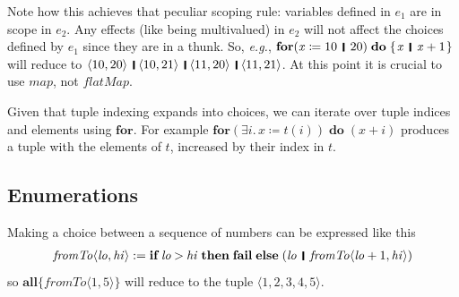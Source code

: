 \documentclass[acmsmall,review,dvipsnames]{acmart}
\newcommand{\Varid}[1]{\mathit{#1}}
\newcommand{\eg}{\emph{e.g.}}
\begin{document}
Note how this achieves that peculiar scoping rule: variables defined in \ensuremath{\Varid{e}_{\mathrm{1}}} are in scope in \ensuremath{\Varid{e}_{\mathrm{2}}}.
Any effects (like being multivalued) in \ensuremath{\Varid{e}_{\mathrm{2}}} will not affect the choices defined by \ensuremath{\Varid{e}_{\mathrm{1}}} since they are in a thunk.
So, {\eg}, \ensuremath{\textbf{for} (\Varid{x}\mathrel{\coloneqq}\mathrm{10}\hspace{1mm}\mathop{\rule[-0.3mm]{0.5mm}{2.5mm}}\hspace{1mm}\mathrm{20})\;\textbf{do}\;\{\mskip1.5mu \Varid{x}\hspace{1mm}\mathop{\rule[-0.3mm]{0.5mm}{2.5mm}}\hspace{1mm}\Varid{x}\mathbin{+}\mathrm{1}\mskip1.5mu\}} will reduce to
\ensuremath{\langle{}\mathrm{10},\mathrm{20}\rangle\hspace{1mm}\mathop{\rule[-0.3mm]{0.5mm}{2.5mm}}\hspace{1mm}\langle{}\mathrm{10},\mathrm{21}\rangle\hspace{1mm}\mathop{\rule[-0.3mm]{0.5mm}{2.5mm}}\hspace{1mm}\langle{}\mathrm{11},\mathrm{20}\rangle\hspace{1mm}\mathop{\rule[-0.3mm]{0.5mm}{2.5mm}}\hspace{1mm}\langle{}\mathrm{11},\mathrm{21}\rangle}.
At this point it is crucial to use \ensuremath{\Varid{map}}, not \ensuremath{\Varid{flatMap}}.

Given that tuple indexing expands into choices, we can iterate over tuple indices and elements using \ensuremath{\textbf{for}}.
For example \ensuremath{\textbf{for} (\exists\Varid{i}.\,\Varid{x}\mathrel{\coloneqq}\Varid{t}(\Varid{i}))\;\textbf{do}\;(\Varid{x}\mathbin{+}\Varid{i})} produces a tuple with the elements of \ensuremath{\Varid{t}}, increased by their index in \ensuremath{\Varid{t}}.


\subsection{Enumerations}
Making a choice between a sequence of numbers can be expressed like this
$$
\begin{array}{l@{\;}c@{\;}l}
  \ensuremath{\Varid{fromTo}\langle\Varid{lo},\Varid{hi}\rangle} & := & \ensuremath{\textbf{if}\;\Varid{lo}\mathbin{>}\Varid{hi}\;\textbf{then}\;\textbf{fail}\;\textbf{else}\;(\Varid{lo}\hspace{1mm}\mathop{\rule[-0.3mm]{0.5mm}{2.5mm}}\hspace{1mm}\Varid{fromTo}\langle\Varid{lo}\mathbin{+}\mathrm{1},\Varid{hi}\rangle)}
\end{array}
$$
so \ensuremath{\textbf{all}\{\Varid{fromTo}\langle\mathrm{1},\mathrm{5}\rangle\}} will reduce to the tuple \ensuremath{\langle{}\mathrm{1},\mathrm{2},\mathrm{3},\mathrm{4},\mathrm{5}\rangle}.
\end{document}
